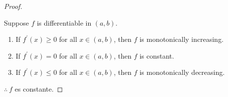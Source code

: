 \begin{proof}
\begin{tcolorbox}[colback=gray!15,colframe=gray!1!gray,title=Teorema 5.11 de \cite{rudin1976principles}]
Suppose $f$ is differentiable in $(a, b)$.
\begin{enumerate}
    \item If $f^{\prime}(x) \geq 0$ for all $x \in(a, b)$, then $f$ is monotonically increasing.
    \item If $f^{\prime}(x)=0$ for all $x \in(a, b)$, then $f$ is constant.
    \item If $f^{\prime}(x) \leq 0$ for all $x \in(a, b)$, then $f$ is monotonically decreasing.
\end{enumerate}
\end{tcolorbox}
$\therefore \ f$ es constante. 

\end{proof}